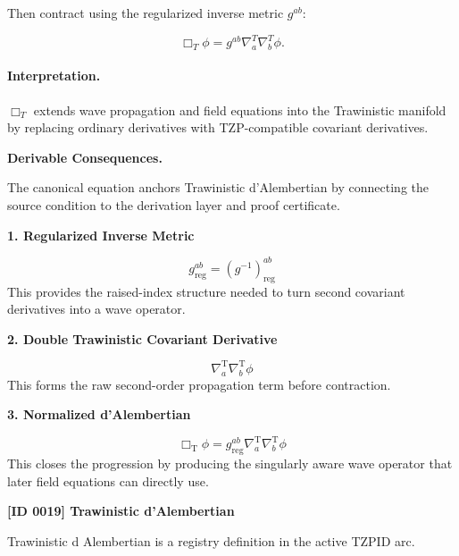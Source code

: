 Then contract using the regularized inverse metric $g^{ab}$:

\begin{equation}
\Box_T\phi
=
g^{ab}
\nabla^{T}_{a}
\nabla^{T}_{b}
\phi .
\end{equation}

\paragraph{Interpretation.}
$\Box_T$ extends wave propagation and field equations into the Trawinistic manifold by replacing ordinary derivatives with TZP-compatible covariant derivatives.

\par\vspace{0.35em}
\noindent\textbf{Derivable Consequences.}\quad
\begingroup
\footnotesize
\raggedright
The canonical equation anchors Trawinistic d'Alembertian by connecting the source condition to the derivation layer and proof certificate.
\par\endgroup

\noindent\textbf{1. Regularized Inverse Metric}\par
\[
g_{\mathrm{reg}}^{ab}
=
\left(g^{-1}\right)_{\mathrm{reg}}^{ab}
\]
\noindent This provides the raised-index structure needed to turn second covariant derivatives into a wave operator.\par
\noindent\textbf{2. Double Trawinistic Covariant Derivative}\par
\[
\nabla^{\mathrm{T}}_{a}
\nabla^{\mathrm{T}}_{b}\phi
\]
\noindent This forms the raw second-order propagation term before contraction.\par
\noindent\textbf{3. Normalized d'Alembertian}\par
\[
\Box_{\mathrm{T}}\phi
=
g_{\mathrm{reg}}^{ab}
\nabla^{\mathrm{T}}_{a}
\nabla^{\mathrm{T}}_{b}\phi
\]
\noindent This closes the progression by producing the singularly aware wave operator that later field equations can directly use.\par

\clearpage
\noindent\textbf{[ID 0019] Trawinistic d'Alembertian}\par
\vspace{0.35em}
\begingroup\small
{}
Trawinistic d Alembertian is a registry definition in the active TZPID arc.

